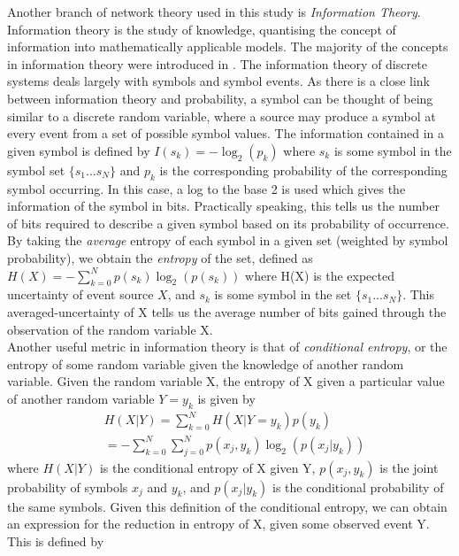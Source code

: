 \documentclass[letterpaper, 10 pt, conference]{ieeeconf}  %
\begin{document}
Another branch of network theory used in this study is \emph{Information Theory}. Information theory is the study of knowledge, quantising the concept of information into mathematically applicable models. The majority of the concepts in information theory were introduced in \cite{shannon1948mathematical}. The information theory of discrete systems deals largely with symbols and symbol events. As there is a close link between information theory and probability, a symbol can be thought of being similar to a discrete random variable, where a source may produce a symbol at every event from a set of possible symbol values. The information contained in a given symbol is defined by $I(s_{k}) = -\log_{2}(p_{k})$ where $s_{k}$ is some symbol in the symbol set $\{s_{1}...s_{N}\}$ and $p_{k}$ is the corresponding probability of the corresponding symbol occurring. In this case, a log to the base 2 is used which gives the information of the symbol in bits. Practically speaking, this tells us the number of bits required to describe a given symbol based on its probability of occurrence. By taking the \emph{average} entropy of each symbol in a given set (weighted by symbol probability), we obtain the \emph{entropy} of the set, defined as $H(X) = -\sum_{k=0}^{N}p(s_{k})\log_{2}(p(s_{k}))$ where H(X) is the expected uncertainty of event source $X$, and $s_{k}$ is some symbol in the set $\{s_{1}...s_{N}\}$. This averaged-uncertainty of X tells us the average number of bits gained through the observation of the random variable X.\\
Another useful metric in information theory is that of \emph{conditional entropy}, or the entropy of some random variable given the knowledge of another random variable. Given the random variable X, the entropy of X given a particular value of another random variable $Y=y_{k}$ is given by
\begin{equation}
\begin{aligned}
    \label{eq:condEnt}
    & H(X|Y) = \sum_{k=0}^{N}H(X|Y=y_{k})p(y_{k}) \\
    & = -\sum_{k=0}^{N}\sum_{j=0}^{N}p(x_{j},y_{k})\log_{2}(p(x_{j}|y_{k}))
\end{aligned}
\end{equation}
where $H(X|Y)$ is the conditional entropy of X given Y, $p(x_{j},y_{k})$ is the joint probability of symbols $x_{j}$ and $y_{k}$, and $p(x_{j}|y_{k})$ is the conditional probability of the same symbols. Given this definition of the conditional entropy, we can obtain an expression for the reduction in entropy of X, given some observed event Y. This is defined by
\end{document}
